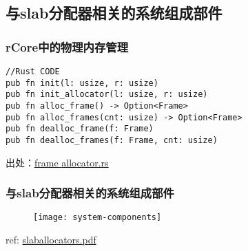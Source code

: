 \subsection{与slab分配器相关的系统组成部件} %
\begin{frame}[fragile]   
    \frametitle{rCore中的物理内存管理}

\begin{block}{}
\begin{verbatim}
//Rust CODE
pub fn init(l: usize, r: usize)
pub fn init_allocator(l: usize, r: usize)
pub fn alloc_frame() -> Option<Frame>
pub fn alloc_frames(cnt: usize) -> Option<Frame>
pub fn dealloc_frame(f: Frame)
pub fn dealloc_frames(f: Frame, cnt: usize) 
\end{verbatim}
\end{block}

出处：\href{https://github.com/rcore-os/rCore_tutorial/blob/ch4-pa2/os/src/memory/frame_allocator.rs}{frame\uline{ }allocator.rs}

\end{frame}
\begin{frame}[plain,t]    
    \frametitle{与slab分配器相关的系统组成部件}
    \begin{figure}
        \centering
        \texttt{[image: system-components]}
    \end{figure}

    ref: \href{https://events.static.linuxfound.org/sites/events/files/slides/slaballocators.pdf}{slaballocators.pdf}

\end{frame}
